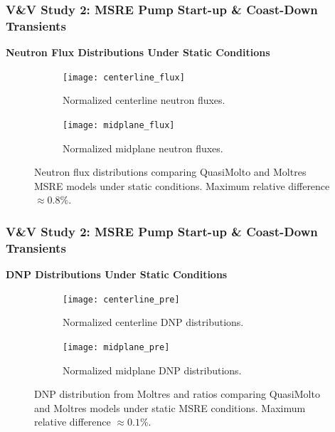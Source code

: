 \begin{frame}
  \frametitle{V\&V Study 2: MSRE Pump Start-up \& Coast-Down Transients}
  \textbf{Neutron Flux Distributions Under Static Conditions}
  \begin{figure}[h]
    \centering
    \begin{subfigure}[b]{0.48\columnwidth}
      \centering
      \texttt{[image: centerline\_flux]}
      \caption{Normalized centerline neutron fluxes.}
      \label{fig:centerline-flux-dist}
    \end{subfigure}
    \hfill
    \begin{subfigure}[b]{0.48\columnwidth}
      \centering
      \texttt{[image: midplane\_flux]}
      \caption{Normalized midplane neutron fluxes.}
      \label{fig:midplane-flux-dist}
    \end{subfigure}
    \caption{Neutron flux distributions comparing QuasiMolto and Moltres
    \gls{MSRE} models under static conditions. Maximum relative difference $\approx 0.8 \%$.}
    \label{fig:centerline-flux}
  \end{figure}
\end{frame}

\begin{frame}
  \frametitle{V\&V Study 2: MSRE Pump Start-up \& Coast-Down Transients}
  \textbf{DNP Distributions Under Static Conditions}
  \begin{figure}[t]
    \centering
    \begin{subfigure}[b]{0.48\columnwidth}
      \centering
      \texttt{[image: centerline\_pre]}
      \caption{Normalized centerline \gls{DNP} distributions.}
      \label{fig:centerline-pre-dist}
    \end{subfigure}
    \hfill
    \begin{subfigure}[b]{0.48\columnwidth}
      \centering
      \texttt{[image: midplane\_pre]}
      \caption{Normalized midplane \gls{DNP} distributions.}
      \label{fig:midplane-pre-dist}
    \end{subfigure}
    \caption{\gls{DNP} distribution from Moltres and ratios comparing QuasiMolto and
    Moltres models under static \gls{MSRE} conditions. Maximum relative difference $\approx 0.1 \%$.}
    \label{fig:centerline-pre}
  \end{figure}
\end{frame}


